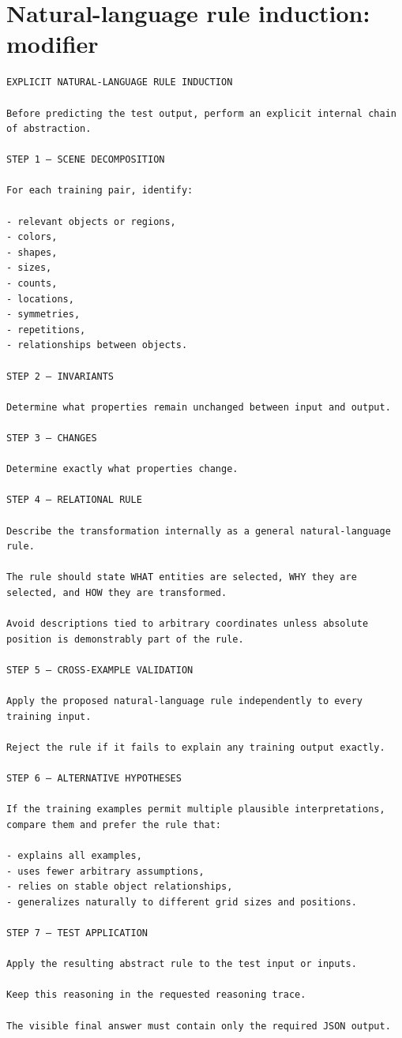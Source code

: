 \documentclass[a4paper,10pt]{article}
\begin{document}
\section*{Natural-language rule induction: modifier}
\begin{Verbatim}[breaklines=true,breakanywhere=false,breaksymbolleft={},fontsize=\small]
EXPLICIT NATURAL-LANGUAGE RULE INDUCTION

Before predicting the test output, perform an explicit internal chain of abstraction.

STEP 1 — SCENE DECOMPOSITION

For each training pair, identify:

- relevant objects or regions,
- colors,
- shapes,
- sizes,
- counts,
- locations,
- symmetries,
- repetitions,
- relationships between objects.

STEP 2 — INVARIANTS

Determine what properties remain unchanged between input and output.

STEP 3 — CHANGES

Determine exactly what properties change.

STEP 4 — RELATIONAL RULE

Describe the transformation internally as a general natural-language rule.

The rule should state WHAT entities are selected, WHY they are selected, and HOW they are transformed.

Avoid descriptions tied to arbitrary coordinates unless absolute position is demonstrably part of the rule.

STEP 5 — CROSS-EXAMPLE VALIDATION

Apply the proposed natural-language rule independently to every training input.

Reject the rule if it fails to explain any training output exactly.

STEP 6 — ALTERNATIVE HYPOTHESES

If the training examples permit multiple plausible interpretations, compare them and prefer the rule that:

- explains all examples,
- uses fewer arbitrary assumptions,
- relies on stable object relationships,
- generalizes naturally to different grid sizes and positions.

STEP 7 — TEST APPLICATION

Apply the resulting abstract rule to the test input or inputs.

Keep this reasoning in the requested reasoning trace.

The visible final answer must contain only the required JSON output.
\end{Verbatim}
\end{document}
